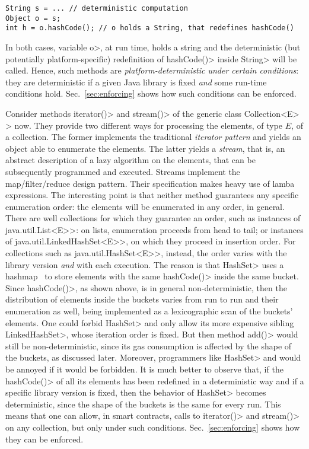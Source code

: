 {\small
\begin{verbatim}
String s = ... // deterministic computation
Object o = s;
int h = o.hashCode(); // o holds a String, that redefines hashCode()
\end{verbatim}}

\noindent
In both cases, variable \<o>, at run time,
holds a string and the deterministic (but potentially platform-specific)
redefinition of \<hashCode()> inside \<String> will be called.
Hence, such methods are \emph{platform-deterministic under certain conditions}:
they are deterministic if a given Java library is fixed \emph{and} some run-time conditions hold.
Sec.~\ref{sec:enforcing} shows how such conditions can be enforced.

Consider methods \<iterator()> and \<stream()> of the generic class
\<Collection$\text{<}$E$\text{>}$> now. They provide two different ways for
processing the elements, of type $E$, of a collection. The former implements
the traditional \emph{iterator pattern} and yields an object able to enumerate
the elements. The latter yields a \emph{stream}, that is,
an abstract description of a lazy algorithm on the
elements, that can be subsequently programmed and executed.
Streams implement the map/filter/reduce design pattern. Their specification
makes heavy use of lamba expressions.
The interesting point is that neither method
guarantees any specific enumeration order: the elements will be
enumerated in any order, in general. There are well collections for which they
guarantee an order, such as instances of \<java.util.List$\text{<}$E$\text{>}$>:
on lists, enumeration proceeds from head to tail;
or instances of \<java.util.LinkedHashSet$\text{<}$E$\text{>}$>, on which they proceed in
insertion order.
For collections such as \<java.util.HashSet$\text{<}$E$\text{>}$>, instead, the order
varies with the library version \emph{and} with each execution. The reason is that
\<HashSet> uses a hashmap~\cite{CormenLRS09}
to store elements with the same \<hashCode()> inside the same bucket.
Since \<hashCode()>, as shown above, is in general non-deterministic, then
the distribution of elements inside the buckets varies from run to run and their enumeration
as well, being implemented as a lexicographic scan of the buckets' elements.
One could forbid \<HashSet> and only allow its
more expensive sibling \<LinkedHashSet>, whose iteration order is fixed.
But then method \<add()> would still be non-deterministic, since its gas consumption
is affected by the shape of the buckets, as discussed later.
Moreover, programmers like \<HashSet> and would be annoyed if it would be
forbidden. It is much better to observe that, if the \<hashCode()> of all its elements has been redefined in a deterministic way
and if a specific library version is fixed, then the behavior of \<HashSet> becomes
deterministic, since the shape of the buckets is the same for every run. This means that one
can allow, in smart contracts, calls to \<iterator()> and \<stream()> on any collection,
but only under such conditions. Sec.~\ref{sec:enforcing} shows how they can be enforced.

